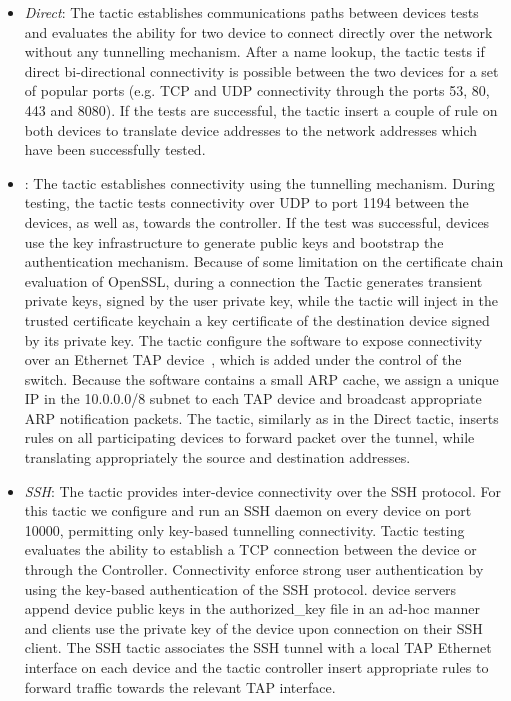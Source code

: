 \begin{itemize}

  \item \emph{Direct}: The tactic establishes communications paths between
    devices tests and evaluates the ability for two device to connect directly
    over the network without any tunnelling mechanism. After a name lookup, the
    tactic tests if direct bi-directional connectivity is possible between the
    two devices for a set of popular ports (e.g. TCP and UDP connectivity
    through the ports 53, 80, 443 and 8080). If the tests are successful, the
    tactic insert a couple of \of rule on both devices to translate \signpost
    device addresses to the network addresses which have been successfully
    tested. 

  \item \emph{\openvpn}: The \openvpn tactic establishes connectivity using the
    \openvpn tunnelling mechanism. During testing, the tactic tests connectivity
    over UDP to port 1194 between the devices, as well as, towards the
    controller. If the test was successful, \signpost devices  use the \signpost
    key infrastructure to generate public keys and bootstrap the \openvpn
    authentication mechanism.  Because of some limitation on the certificate
    chain evaluation of OpenSSL, during a connection the Tactic generates
    transient private keys, signed by the user private key, while the tactic
    will inject in the trusted certificate keychain a key certificate of the
    destination device signed by its private key.  The tactic configure the
    \openvpn software to expose connectivity over an Ethernet TAP
    device~\cite{tuntap}, which is added under the control of the \of switch.
    Because the \openvpn software contains a small ARP cache, we assign a unique
    IP in the 10.0.0.0/8 subnet to each TAP device and broadcast appropriate ARP
    notification packets.  The tactic, similarly as in the Direct tactic,
    inserts \of rules on all participating devices to forward packet over the
    \openvpn tunnel, while translating appropriately the source and destination
    addresses. 

  \item \emph{SSH}:  The tactic provides inter-device connectivity over the SSH
    protocol. For this tactic we configure and run an SSH daemon on every
    \signpost device on port 10000, permitting only key-based tunnelling
    connectivity.  Tactic testing evaluates the ability to establish a TCP
    connection between the device or through the Controller.  Connectivity
    enforce strong user authentication by using the key-based authentication of
    the SSH protocol. \signpost device servers append device public keys in the
    authorized\_key file in an ad-hoc manner and clients use the private key of
    the device upon connection on their SSH client.  The SSH tactic associates
    the SSH tunnel with a local TAP Ethernet interface on each device and the
    tactic controller insert appropriate \of rules to forward traffic towards
    the relevant TAP interface.


\end{itemize}
